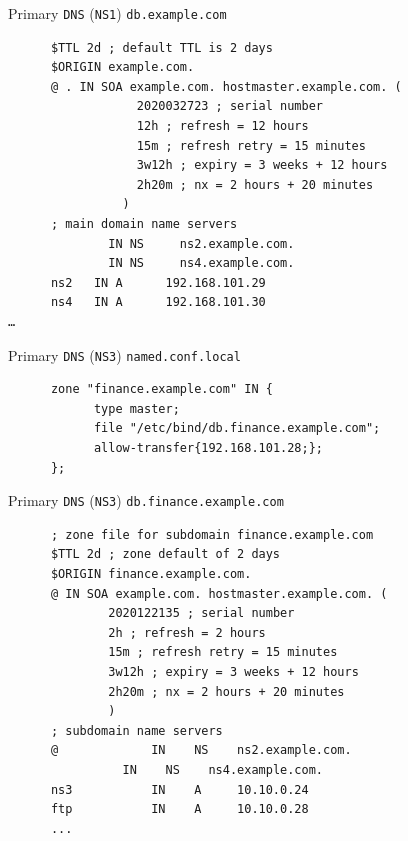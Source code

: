 \documentclass[xcolor=table]{beamer}
\begin{document}
\begin{frame}[fragile]{Primary \texttt{DNS} (\texttt{NS1}) \texttt{db.example.com}}
  \begin{tcolorbox}
    \lstset{
      basicstyle=\tiny\ttfamily,
    }
    \begin{lstlisting}
      $TTL 2d ; default TTL is 2 days
      $ORIGIN example.com.
      @ . IN SOA example.com. hostmaster.example.com. (
	              2020032723 ; serial number
	              12h ; refresh = 12 hours
	              15m ; refresh retry = 15 minutes
	              3w12h ; expiry = 3 weeks + 12 hours
	              2h20m ; nx = 2 hours + 20 minutes
                )
      ; main domain name servers
	          IN NS 	ns2.example.com.
	          IN NS 	ns4.example.com.
      ns2 	IN A 	  192.168.101.29
      ns4 	IN A 	  192.168.101.30
…
    \end{lstlisting}
  \end{tcolorbox}
\end{frame}

\begin{frame}[fragile]{Primary \texttt{DNS} (\texttt{NS3}) \texttt{named.conf.local}}
  \begin{tcolorbox}
    \lstset{
      basicstyle=\tiny\ttfamily,
    }
    \begin{lstlisting}
      zone "finance.example.com" IN {
	        type master;
	        file "/etc/bind/db.finance.example.com";
	        allow-transfer{192.168.101.28;};
      };
    \end{lstlisting}
  \end{tcolorbox}
\end{frame}

\begin{frame}[fragile]{Primary \texttt{DNS} (\texttt{NS3}) \texttt{db.finance.example.com}}
  \begin{tcolorbox}
    \lstset{
      basicstyle=\tiny\ttfamily,
    }
    \begin{lstlisting}
      ; zone file for subdomain finance.example.com
      $TTL 2d ; zone default of 2 days
      $ORIGIN finance.example.com.
      @	IN SOA example.com. hostmaster.example.com. (
              2020122135 ; serial number
              2h ; refresh = 2 hours
              15m ; refresh retry = 15 minutes
              3w12h ; expiry = 3 weeks + 12 hours
              2h20m ; nx = 2 hours + 20 minutes
              )
      ; subdomain name servers
      @			    IN    NS    ns2.example.com.
                IN    NS    ns4.example.com.
      ns3 			IN    A     10.10.0.24
      ftp 			IN    A     10.10.0.28
      ...   
    \end{lstlisting}
  \end{tcolorbox}
\end{frame}
\end{document}

